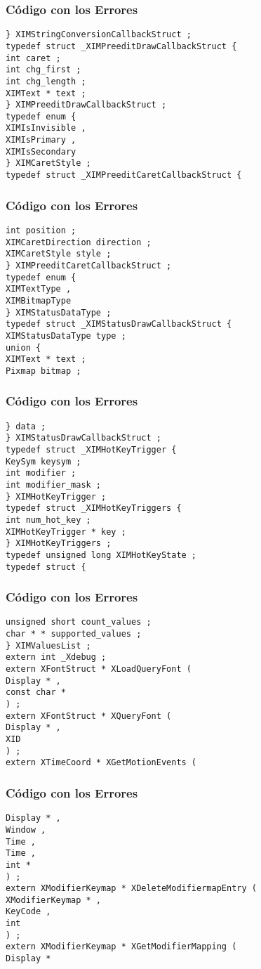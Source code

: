 \documentclass{beamer}
\begin{document}
\begin{frame}[fragile]
\frametitle{C\'odigo con los Errores}
\begin{verbatim}
} XIMStringConversionCallbackStruct ; 
typedef struct _XIMPreeditDrawCallbackStruct { 
int caret ; 
int chg_first ; 
int chg_length ; 
XIMText * text ; 
} XIMPreeditDrawCallbackStruct ; 
typedef enum { 
XIMIsInvisible , 
XIMIsPrimary , 
XIMIsSecondary 
} XIMCaretStyle ; 
typedef struct _XIMPreeditCaretCallbackStruct { 
\end{verbatim}
\end{frame}
\begin{frame}[fragile]
\frametitle{C\'odigo con los Errores}
\begin{verbatim}
int position ; 
XIMCaretDirection direction ; 
XIMCaretStyle style ; 
} XIMPreeditCaretCallbackStruct ; 
typedef enum { 
XIMTextType , 
XIMBitmapType 
} XIMStatusDataType ; 
typedef struct _XIMStatusDrawCallbackStruct { 
XIMStatusDataType type ; 
union { 
XIMText * text ; 
Pixmap bitmap ; 
\end{verbatim}
\end{frame}
\begin{frame}[fragile]
\frametitle{C\'odigo con los Errores}
\begin{verbatim}
} data ; 
} XIMStatusDrawCallbackStruct ; 
typedef struct _XIMHotKeyTrigger { 
KeySym keysym ; 
int modifier ; 
int modifier_mask ; 
} XIMHotKeyTrigger ; 
typedef struct _XIMHotKeyTriggers { 
int num_hot_key ; 
XIMHotKeyTrigger * key ; 
} XIMHotKeyTriggers ; 
typedef unsigned long XIMHotKeyState ; 
typedef struct { 
\end{verbatim}
\end{frame}
\begin{frame}[fragile]
\frametitle{C\'odigo con los Errores}
\begin{verbatim}
unsigned short count_values ; 
char * * supported_values ; 
} XIMValuesList ; 
extern int _Xdebug ; 
extern XFontStruct * XLoadQueryFont ( 
Display * , 
const char * 
) ; 
extern XFontStruct * XQueryFont ( 
Display * , 
XID 
) ; 
extern XTimeCoord * XGetMotionEvents ( 
\end{verbatim}
\end{frame}
\begin{frame}[fragile]
\frametitle{C\'odigo con los Errores}
\begin{verbatim}
Display * , 
Window , 
Time , 
Time , 
int * 
) ; 
extern XModifierKeymap * XDeleteModifiermapEntry ( 
XModifierKeymap * , 
KeyCode , 
int 
) ; 
extern XModifierKeymap * XGetModifierMapping ( 
Display * 
\end{verbatim}
\end{frame}
\end{document}
